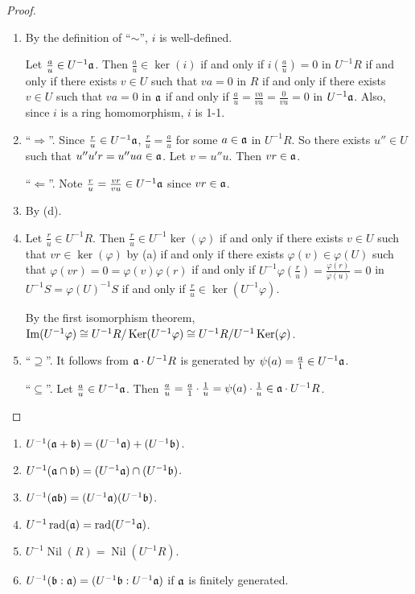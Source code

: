 \begin{proof}
    \begin{enumerate}
        \item By the definition of ``$\sim$'', $i$ is well-defined. \par 
            Let $\frac{a}{u} \in U^{-1}\mathfrak{a}$. Then $\frac{a}{u} \in \ker(i)$ if and only if $i(\frac{a}{u})=0$ in $U^{-1}R$ if and only if there exists $v \in U$ such that $va = 0$ in $R$ if and only if there exists $v \in U$ such that $va = 0$ in $\mathfrak{a}$ if and only if $\frac{a}{u} = \frac{va}{vu} = \frac{0}{vu} = 0$ in $U^{-1}\mathfrak{a}$. Also, since $i$ is a ring homomorphism, $i$ is 1-1.
        \item ``$\Rightarrow$''. Since $\frac{r}{u} \in U^{-1}\mathfrak{a}$, $\frac{r}{u} = \frac{a}{u}$ for some $a \in \mathfrak{a}$ in $U^{-1}R$. So there exists $u'' \in U$ such that $u''u'r = u''ua \in \mathfrak{a}$. Let $v = u''u$. Then $vr \in \mathfrak{a}$. \par 
            ``$\Leftarrow$''. Note $\frac{r}{u} = \frac{vr}{vu} \in U^{-1}\mathfrak{a}$ since $vr \in \mathfrak{a}$.
        \item By (d).
        \item Let $\frac{r}{u} \in U^{-1}R$. Then $\frac{r}{u} \in U^{-1}\ker(\varphi)$ if and only if there exists $v \in U$ such that $vr \in \ker(\varphi)$ by (a) if and only if there exists $\varphi(v) \in \varphi(U)$ such that $\varphi(vr) = 0 = \varphi(v)\varphi(r)$ if and only if $U^{-1}\varphi(\frac{r}{u}) = \frac{\varphi(r)}{\varphi(u)} = 0$ in $U^{-1}S = \varphi(U)^{-1}S$ if and only if $\frac{r}{u} \in \ker(U^{-1}\varphi)$. \par 
            By the first isomorphism theorem, $\operatorname{Im}(U^{-1}\varphi) \cong U^{-1}R/\operatorname{Ker}(U^{-1}\varphi) \cong U^{-1}R/U^{-1}\operatorname{Ker}(\varphi)$.  
        \item 
            ``$\supseteq$''. It follows from $\mathfrak{a} \cdot U^{-1}R$ is generated by $\psi(a) = \frac{a}{1} \in U^{-1}\mathfrak{a}$. \par 
            ``$\subseteq$''. Let $\frac{a}{u} \in U^{-1}\mathfrak{a}$. Then $\frac{a}{u} = \frac{a}{1} \cdot \frac{1}{u} = \psi(a) \cdot \frac{1}{u} \in \mathfrak{a} \cdot U^{-1}R$. \qedhere
    \end{enumerate}
\end{proof}

\begin{proposition}
    \begin{enumerate}
        \item $U^{-1}(\mathfrak{a} + \mathfrak{b}) = (U^{-1}\mathfrak{a}) + (U^{-1}\mathfrak{b})$.
        \item $U^{-1}(\mathfrak{a} \cap \mathfrak{b}) = (U^{-1}\mathfrak{a}) \cap (U^{-1}\mathfrak{b})$.
        \item $U^{-1}(\mathfrak{a} \mathfrak{b}) = (U^{-1}\mathfrak{a}) (U^{-1}\mathfrak{b})$.
        \item $U^{-1} \operatorname{rad}(\mathfrak{a}) = \operatorname{rad}(U^{-1}\mathfrak{a})$.
        \item $U^{-1}\operatorname{Nil}(R) = \operatorname{Nil}(U^{-1}R)$.
        \item $U^{-1}(\mathfrak{b}:\mathfrak{a}) = (U^{-1}\mathfrak{b}:U^{-1}\mathfrak{a})$  if $\mathfrak{a}$ is finitely generated.
    \end{enumerate}
\end{proposition}

